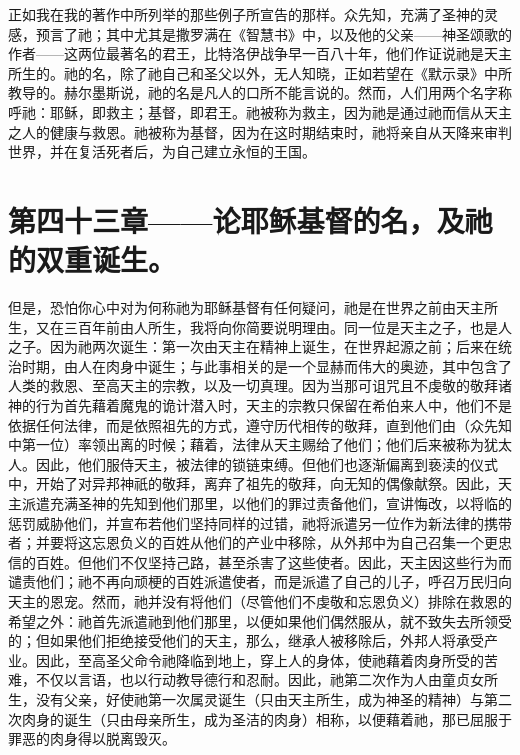 正如我在我的著作中所列举的那些例子所宣告的那样。众先知，充满了圣神的灵感，预言了祂；其中尤其是撒罗满在《智慧书》中，以及他的父亲——神圣颂歌的作者——这两位最著名的君王，比特洛伊战争早一百八十年，他们作证说祂是天主所生的。祂的名，除了祂自己和圣父以外，无人知晓，正如若望在《默示录》中所教导的。赫尔墨斯说，祂的名是凡人的口所不能言说的。然而，人们用两个名字称呼祂：耶稣，即救主；基督，即君王。祂被称为救主，因为祂是通过祂而信从天主之人的健康与救恩。祂被称为基督，因为在这时期结束时，祂将亲自从天降来审判世界，并在复活死者后，为自己建立永恒的王国。\par


\section{第四十三章——论耶稣基督的名，及祂的双重诞生。}

但是，恐怕你心中对为何称祂为耶稣基督有任何疑问，祂是在世界之前由天主所生，又在三百年前由人所生，我将向你简要说明理由。同一位是天主之子，也是人之子。因为祂两次诞生：第一次由天主在精神上诞生，在世界起源之前；后来在统治时期，由人在肉身中诞生；与此事相关的是一个显赫而伟大的奥迹，其中包含了人类的救恩、至高天主的宗教，以及一切真理。因为当那可诅咒且不虔敬的敬拜诸神的行为首先藉着魔鬼的诡计潜入时，天主的宗教只保留在希伯来人中，他们不是依据任何法律，而是依照祖先的方式，遵守历代相传的敬拜，直到他们由（众先知中第一位）率领出离的时候；藉着，法律从天主赐给了他们；他们后来被称为犹太人。因此，他们服侍天主，被法律的锁链束缚。但他们也逐渐偏离到亵渎的仪式中，开始了对异邦神祇的敬拜，离弃了祖先的敬拜，向无知的偶像献祭。因此，天主派遣充满圣神的先知到他们那里，以他们的罪过责备他们，宣讲悔改，以将临的惩罚威胁他们，并宣布若他们坚持同样的过错，祂将派遣另一位作为新法律的携带者；并要将这忘恩负义的百姓从他们的产业中移除，从外邦中为自己召集一个更忠信的百姓。但他们不仅坚持己路，甚至杀害了这些使者。因此，天主因这些行为而谴责他们；祂不再向顽梗的百姓派遣使者，而是派遣了自己的儿子，呼召万民归向天主的恩宠。然而，祂并没有将他们（尽管他们不虔敬和忘恩负义）排除在救恩的希望之外：祂首先派遣祂到他们那里，以便如果他们偶然服从，就不致失去所领受的；但如果他们拒绝接受他们的天主，那么，继承人被移除后，外邦人将承受产业。因此，至高圣父命令祂降临到地上，穿上人的身体，使祂藉着肉身所受的苦难，不仅以言语，也以行动教导德行和忍耐。因此，祂第二次作为人由童贞女所生，没有父亲，好使祂第一次属灵诞生（只由天主所生，成为神圣的精神）与第二次肉身的诞生（只由母亲所生，成为圣洁的肉身）相称，以便藉着祂，那已屈服于罪恶的肉身得以脱离毁灭。\par

